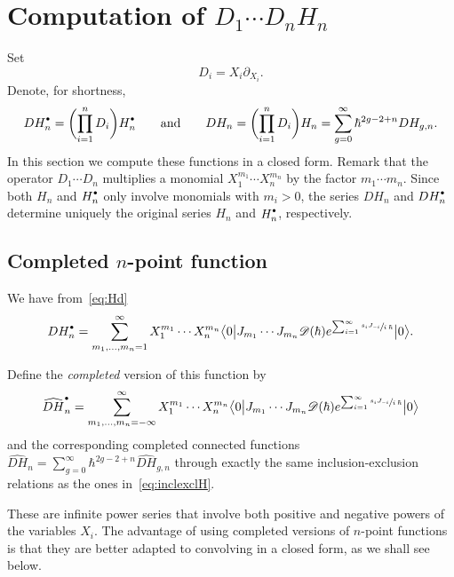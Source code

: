 \documentclass[JEP,XML,SOM,Unicode,NoEqCountersInSection,NoFloatCountersInSection]{cedram}
\let\mathcal\mathscr
\newcommand{\sbullet}{{\scriptscriptstyle\bullet}}
\newcommand{\csbullet}{{\raisebox{1pt}{$\sbullet$}}}
\theoremstyle{plain}
\theoremstyle{definition}
\theoremstyle{remark}
\newcommand{\VEV}[1]{{\bigl\langle 0 \big| {#1} \big| 0 \bigr\rangle}}
\newcommand{\Hd}{H^\csbullet}
\begin{document}
\section{Computation of \texorpdfstring{$D_1\cdots D_n H_n$}{D1...DnHn}} \label{sec:CompDH}

Set
\begin{equation*}
D_i=X_i\partial_{X_i}.
\end{equation*}
Denote, for shortness,
\begin{equation*}
DH^\csbullet_n=\biggl(\prod_{i=1}^n D_i \biggr)\Hd_n\qquad \text{and} \qquad
DH_n= \biggl(\prod_{i=1}^n D_i \biggr)H_n
=\sum_{g=0}^\infty \hbar^{2g-2+n}DH_{g,n}.
\end{equation*}
In this section we compute these functions in a closed form. Remark that the operator $D_1\cdots D_n$ multiplies a monomial $X_1^{m_1}\cdots X_n^{m_n}$ by the factor $m_1\cdots m_n$. Since both $H_n$ and $\Hd_n$ only involve monomials with $m_i>0$, the series $DH_n$ and $D\Hd_n$ determine uniquely the original series $H_n$ and $\Hd_n$, respectively.

\subsection{Completed \texorpdfstring{$n$}{n}-point function}
We have from~\eqref{eq:Hd}
\begin{equation}\label{eq:DHd}
D\Hd_n=\sum_{m_1,\dots,m_n=1}^\infty X_1^{m_1}\cdots X_n^{m_n}
\VEV{J_{m_1}\cdots J_{m_n}\mathcal{D}(\hbar)e^{\sum_{i=1}^\infty \sfrac{s_iJ_{-i}}{i\,\hbar}}}.
\end{equation}

Define the \emph{completed} version of this function by
\begin{equation}\label{eq:cDHd}
\widehat{DH}^\csbullet_n=\sum_{m_1,\dots,m_n=-\infty}^\infty X_1^{m_1}\cdots X_n^{m_n}
\VEV{J_{m_1}\cdots J_{m_n}\mathcal{D}(\hbar)e^{\sum_{i=1}^\infty \sfrac{s_iJ_{-i}}{i\,\hbar}}}
\end{equation}
and the corresponding completed connected functions $\widehat{D H}_n=\sum_{g=0}^\infty \hbar^{2g-2+n}\widehat{D H}_{g,n}$ through exactly the same inclusion-exclusion relations as the ones in~\eqref{eq:inclexclH}.

These are infinite power series that involve both positive and negative powers of the variables $X_i$. The advantage of using completed versions of $n$-point functions is that they are better adapted to convolving in a closed form, as we shall see below.
\end{document}
